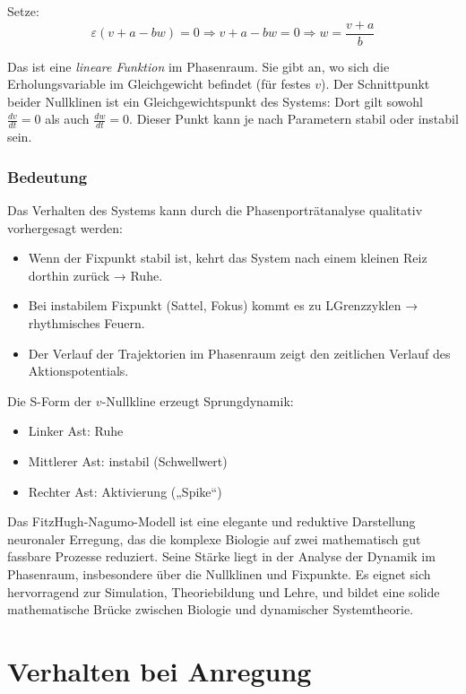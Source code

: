 \begin{refsection}
Setze:
\[
\varepsilon (v + a - b w) = 0 \Rightarrow v + a - b w = 0 \Rightarrow w = \frac{v + a}{b}
\]

Das ist eine \emph{lineare Funktion} im Phasenraum.  
Sie gibt an, wo sich die Erholungsvariable im Gleichgewicht befindet (für festes $v$).
Der Schnittpunkt beider Nullklinen ist ein Gleichgewichtspunkt des Systems: Dort gilt sowohl $\frac{dv}{dt} = 0$ als auch $\frac{dw}{dt} = 0$. Dieser Punkt kann je nach Parametern stabil oder instabil sein.
\subsubsection{Bedeutung}
Das Verhalten des Systems kann durch die Phasenporträtanalyse qualitativ vorhergesagt werden:
\begin{itemize}
	\item Wenn der Fixpunkt stabil ist, kehrt das System nach einem kleinen Reiz dorthin zurück → Ruhe.
	\item Bei instabilem Fixpunkt (Sattel, Fokus) kommt es zu LGrenzzyklen → rhythmisches Feuern.
	\item Der Verlauf der Trajektorien im Phasenraum zeigt den zeitlichen Verlauf des Aktionspotentials.
\end{itemize}
Die S-Form der $v$-Nullkline erzeugt Sprungdynamik:
\begin{itemize}
	\item Linker Ast: Ruhe
	\item Mittlerer Ast: instabil (Schwellwert)
	\item Rechter Ast: Aktivierung („Spike“)
\end{itemize}
Das FitzHugh-Nagumo-Modell ist eine elegante und reduktive Darstellung neuronaler Erregung, das die komplexe Biologie auf zwei mathematisch gut fassbare Prozesse reduziert. Seine Stärke liegt in der Analyse der Dynamik im Phasenraum, insbesondere über die Nullklinen und Fixpunkte. Es eignet sich hervorragend zur Simulation, Theoriebildung und Lehre, und bildet eine solide mathematische Brücke zwischen Biologie und dynamischer Systemtheorie.


\section{Verhalten bei Anregung}

\end{refsection}
